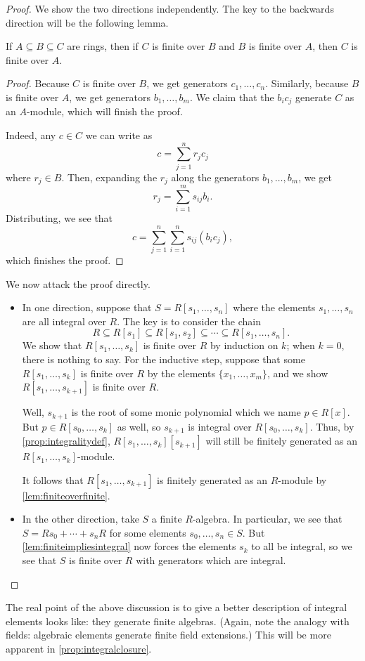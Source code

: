 \begin{proof}
	We show the two directions independently. The key to the backwards direction will be the following lemma.
	\begin{lemma} \label{lem:finiteoverfinite}
		If $A\subseteq B\subseteq C$ are rings, then if $C$ is finite over $B$ and $B$ is finite over $A$, then $C$ is finite over $A$.
	\end{lemma}
	\begin{proof}
		Because $C$ is finite over $B$, we get generators $c_1,\ldots,c_n$. Similarly, because $B$ is finite over $A$, we get generators $b_1,\ldots,b_m$. We claim that the $b_ic_j$ generate $C$ as an $A$-module, which will finish the proof.

		Indeed, any $c\in C$ we can write as
		\[c=\sum_{j=1}^nr_jc_j\]
		where $r_j\in B$. Then, expanding the $r_j$ along the generators $b_1,\ldots,b_m$, we get
		\[r_j=\sum_{i=1}^ms_{ij}b_i.\]
		Distributing, we see that
		\[c=\sum_{j=1}^n\sum_{i=1}^ns_{ij}(b_ic_j),\]
		which finishes the proof.
	\end{proof}
	We now attack the proof directly.
	\begin{itemize}
		\item In one direction, suppose that $S=R[s_1,\ldots,s_n]$ where the elements $s_1,\ldots,s_n$ are all integral over $R$. The key is to consider the chain
		\[R\subseteq R[s_1]\subseteq R[s_1,s_2]\subseteq\cdots\subseteq R[s_1,\ldots,s_n].\]
		We show that $R[s_1,\ldots,s_k]$ is finite over $R$ by induction on $k$; when $k=0$, there is nothing to say. For the inductive step, suppose that some $R[s_1,\ldots,s_k]$ is finite over $R$ by the elements $\{x_1,\ldots,x_m\}$, and we show $R[s_1,\ldots,s_{k+1}]$ is finite over $R$.
		
		Well, $s_{k+1}$ is the root of some monic polynomial which we name $p\in R[x]$. But $p\in R[s_0,\ldots,s_k]$ as well, so $s_{k+1}$ is integral over $R[s_0,\ldots,s_k]$. Thus, by \autoref{prop:integralitydef}, $R[s_1,\ldots,s_k][s_{k+1}]$ will still be finitely generated as an $R[s_1,\ldots,s_k]$-module.

		It follows that $R[s_1,\ldots,s_{k+1}]$ is finitely generated as an $R$-module by \autoref{lem:finiteoverfinite}.

		\item In the other direction, take $S$ a finite $R$-algebra. In particular, we see that $S=Rs_0+\cdots+s_nR$ for some elements $s_0,\ldots,s_n\in S$. But \autoref{lem:finiteimpliesintegral} now forces the elements $s_k$ to all be integral, so we see that $S$ is finite over $R$ with generators which are integral.
		\qedhere
	\end{itemize}
\end{proof}
\begin{remark}[Nir]
	The real point of the above discussion is to give a better description of integral elements looks like: they generate finite algebras. (Again, note the analogy with fields: algebraic elements generate finite field extensions.) This will be more apparent in \autoref{prop:integralclosure}.
\end{remark}

